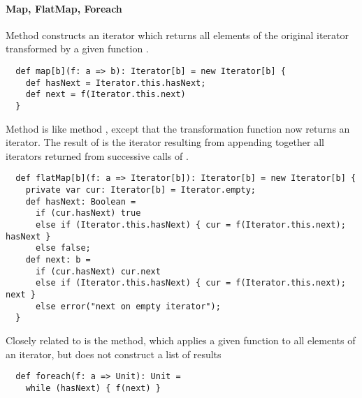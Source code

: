{\paragraph{Map, FlatMap, Foreach} Method  
constructs an iterator which returns all elements of the original
iterator transformed by a given function .
\begin{lstlisting}
  def map[b](f: a => b): Iterator[b] = new Iterator[b] {
    def hasNext = Iterator.this.hasNext;
    def next = f(Iterator.this.next)
  }
\end{lstlisting}
Method  is like method , except that the
transformation function  now returns an iterator.
The result of  is the iterator resulting from appending
together all iterators returned from successive calls of .
\begin{lstlisting}
  def flatMap[b](f: a => Iterator[b]): Iterator[b] = new Iterator[b] {
    private var cur: Iterator[b] = Iterator.empty;
    def hasNext: Boolean = 
      if (cur.hasNext) true
      else if (Iterator.this.hasNext) { cur = f(Iterator.this.next); hasNext }
      else false;
    def next: b = 
      if (cur.hasNext) cur.next
      else if (Iterator.this.hasNext) { cur = f(Iterator.this.next); next }
      else error("next on empty iterator");
  }
\end{lstlisting}
Closely related to  is the  method, which
applies a given function to all elements of an iterator, but does not
construct a list of results
\begin{lstlisting}
  def foreach(f: a => Unit): Unit = 
    while (hasNext) { f(next) }
\end{lstlisting}

}
